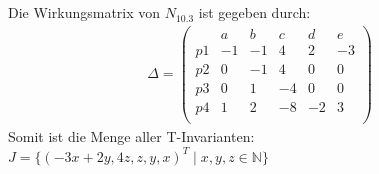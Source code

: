 \documentclass[12pt,a4paper]{../krautsourcing/homework}
\author{Ruben Felgenhauer,\\Alexander Hildebrandt,\\Leonhard Reichenbach}
\begin{document}
\makeheadline

\addtocounter{section}{2}

\section{}

\subsection{}

Die Wirkungsmatrix von \(N_{10.3}\) ist gegeben durch:
\begin{align*}
	\Delta = \left( \begin{array}{c|ccccc}
		& a & b & c & d & e \\
		\hline
		p1 & -1 & -1 & 4 & 2 & -3\\
		p2 & 0 & -1 & 4 & 0 & 0\\
		p3 & 0 & 1 & -4 & 0 & 0\\
		p4 & 1 & 2 & -8 & -2 & 3\\
	\end{array} \right)
\end{align*}
Somit ist die Menge aller T-Invarianten: \(J = \{(-3x+2y,4z,z,y,x)^T \mid x,y,z \in \mathbb{N}\}\)

\subsection{}

\newcommand{\cvec}[1]{\begin{pmatrix}#1\end{pmatrix}}
\end{document}
